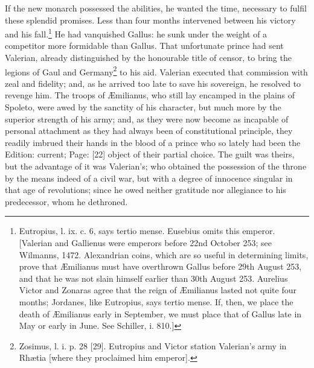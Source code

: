 If the new monarch possessed the abilities, he wanted the time, necessary to fulfil these splendid promises. Less than four months intervened between his victory and his fall.\footnote{Eutropius, l. ix. c. 6, says tertio mense. Eusebius omits this emperor. [Valerian and Gallienus were emperors before 22nd October 253; see Wilmanns, 1472. Alexandrian coins, which are so useful in determining limits, prove that Æmilianus must have overthrown Gallus before 29th August 253, and that he was not slain himself earlier than 30th August 253. Aurelius Victor and Zonaras agree that the reign of Æmilianus lasted not quite four months; Jordanes, like Eutropius, says tertio mense. If, then, we place the death of Æmilianus early in September, we must place that of Gallus late in May or early in June. See Schiller, i. 810.]} He had vanquished Gallus: he sunk under the weight of a competitor more formidable than Gallus. That unfortunate prince had sent Valerian, already distinguished by the honourable title of censor, to bring the legions of Gaul and Germany\footnote{Zosimus, l. i. p. 28 [29]. Eutropius and Victor station Valerian\texthebrew{}’s army in Rhætia [where they proclaimed him emperor].} to his aid. Valerian executed that commission with zeal and fidelity; and, as he arrived too late to save his sovereign, he resolved to revenge him. The troops of Æmilianus, who still lay encamped in the plains of Spoleto, were awed by the sanctity of his character, but much more by the superior strength of his army; and, as they were now become as incapable of personal attachment as they had always been of constitutional principle, they readily imbrued their hands in the blood of a prince who so lately had been the Edition: current; Page: [22] object of their partial choice. The guilt was theirs, but the advantage of it was Valerian\texthebrew{}’s; who obtained the possession of the throne by the means indeed of a civil war, but with a degree of innocence singular in that age of revolutions; since he owed neither gratitude nor allegiance to his predecessor, whom he dethroned.

